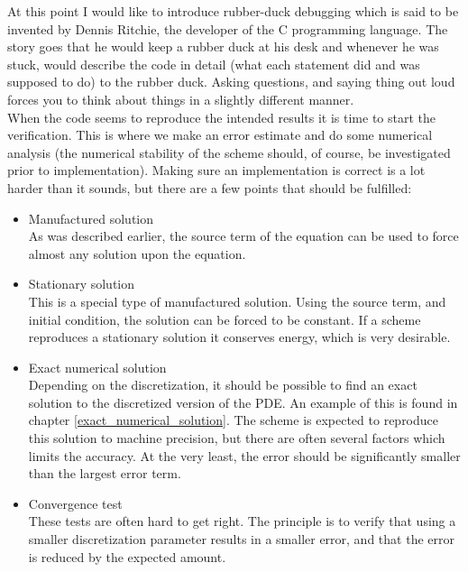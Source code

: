  
\noindent At this point I would like to introduce rubber-duck debugging which is said to be invented by Dennis Ritchie, the developer of the C programming language. 
The story goes that he would keep a rubber duck at his desk and whenever he was stuck, would describe the code in detail (what each statement did and was supposed to do) to the rubber duck. 
Asking questions, and saying thing out loud forces you to think about things in a slightly different manner. \\

\noindent When the code seems to reproduce the intended results it is time to start the verification. 
This is where we make an error estimate and do some numerical analysis (the numerical stability of the scheme should, of course, be investigated prior to implementation). 
Making sure an implementation is correct is a lot harder than it sounds, but there are a few points that should be fulfilled:

\begin{itemize}
 \item Manufactured solution\\
 As was described earlier, the source term of the equation can be used to force almost any solution upon the equation. 
 
 \item Stationary solution\\
 This is a special type of manufactured solution. Using the source term, and initial condition, the solution can be forced to be constant. 
 If a scheme reproduces a stationary solution it conserves energy, which is very desirable.
 \item Exact numerical solution\\
 Depending on the discretization, it should be possible to find an exact solution to the discretized version of the PDE. 
 An example of this is found in chapter \ref{exact_numerical_solution}. 
 The scheme is expected to reproduce this solution to machine precision, but there are often several factors which limits the accuracy. 
 At the very least, the error should be significantly smaller than the largest error term. \\
 \item Convergence test\\
 These tests are often hard to get right. 
 The principle is to verify that using a smaller discretization parameter results in a smaller error, and that the error is reduced by the expected amount. 
\end{itemize}

